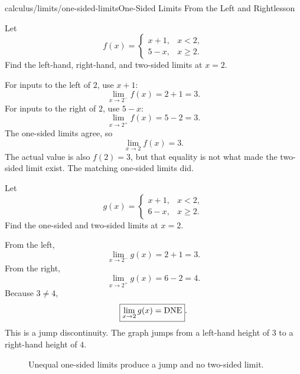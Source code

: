 \begin{webpage}{calculus/limits/one-sided-limits}{One-Sided Limits From the Left and Right}{lesson}
\begin{bgexample}[title={A piecewise function with matching sides}]
Let
\[
  f(x)=
  \begin{cases}
    x+1,&x<2,\\
    5-x,&x\ge2.
  \end{cases}
\]
Find the left-hand, right-hand, and two-sided limits at \(x=2\).

\begin{bgsolution}
For inputs to the left of \(2\), use \(x+1\):
\[
  \lim_{x\to2^-}f(x)=2+1=3.
\]
For inputs to the right of \(2\), use \(5-x\):
\[
  \lim_{x\to2^+}f(x)=5-2=3.
\]
The one-sided limits agree, so
\[
  \boxed{\lim_{x\to2}f(x)=3}.
\]
The actual value is also \(f(2)=3\), but that equality is not what made the two-sided limit exist. The matching one-sided limits did.
\end{bgsolution}
\end{bgexample}

\begin{bgexample}[title={A jump}]
Let
\[
  g(x)=
  \begin{cases}
    x+1,&x<2,\\
    6-x,&x\ge2.
  \end{cases}
\]
Find the one-sided and two-sided limits at \(x=2\).

\begin{bgsolution}
From the left,
\[
  \lim_{x\to2^-}g(x)=2+1=3.
\]
From the right,
\[
  \lim_{x\to2^+}g(x)=6-2=4.
\]
Because \(3\ne4\),
\[
  \boxed{\lim_{x\to2}g(x)=\mathrm{DNE}}.
\]
This is a jump discontinuity. The graph jumps from a left-hand height of \(3\) to a right-hand height of \(4\).
\end{bgsolution}
\end{bgexample}

\begin{figure}[htbp]
\centering
{}
\caption{Unequal one-sided limits produce a jump and no two-sided limit.}
\label{fig:jump}
\end{figure}


\end{webpage}
